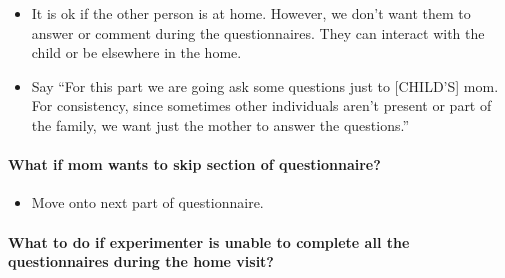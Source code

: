 \documentclass[
]{book}
\providecommand{\tightlist}{%
  \setlength{\itemsep}{0pt}\setlength{\parskip}{0pt}}
\begin{document}
\begin{itemize}
\tightlist
\item
  It is ok if the other person is at home. However, we don't want them to answer or comment during the questionnaires. They can interact with the child or be elsewhere in the home.
\item
  Say ``For this part we are going ask some questions just to {[}CHILD'S{]} mom. For consistency, since sometimes other individuals aren't present or part of the family, we want just the mother to answer the questions.''
\end{itemize}

\hypertarget{what-if-mom-wants-to-skip-section-of-questionnaire}{%
\paragraph*{What if mom wants to skip section of questionnaire?}\label{what-if-mom-wants-to-skip-section-of-questionnaire}}

\begin{itemize}
\tightlist
\item
  Move onto next part of questionnaire.
\end{itemize}

\hypertarget{what-to-do-if-experimenter-is-unable-to-complete-all-the-questionnaires-during-the-home-visit}{%
\paragraph*{What to do if experimenter is unable to complete all the questionnaires during the home visit?}\label{what-to-do-if-experimenter-is-unable-to-complete-all-the-questionnaires-during-the-home-visit}}
\end{document}
